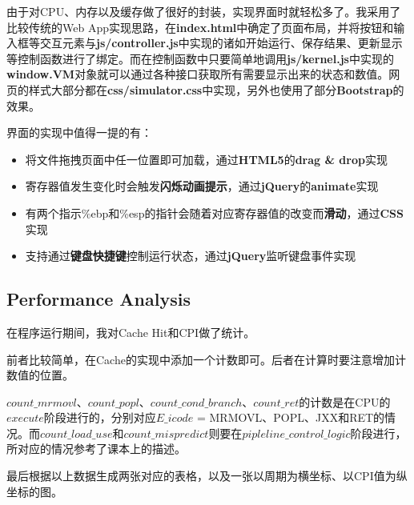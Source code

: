 由于对CPU、内存以及缓存做了很好的封装，实现界面时就轻松多了。我采用了比较传统的Web App实现思路，在{\bf index.html}中确定了页面布局，并将按钮和输入框等交互元素与{\bf js/controller.js}中实现的诸如开始运行、保存结果、更新显示等控制函数进行了绑定。而在控制函数中只要简单地调用{\bf js/kernel.js}中实现的{\bf window.VM}对象就可以通过各种接口获取所有需要显示出来的状态和数值。网页的样式大部分都在{\bf css/simulator.css}中实现，另外也使用了部分{\bf Bootstrap}的效果。

界面的实现中值得一提的有：
\begin{itemize}
\item 将文件拖拽页面中任一位置即可加载，通过{\bf HTML5}的{\bf drag \& drop}实现
\item 寄存器值发生变化时会触发{\bf 闪烁动画提示}，通过{\bf jQuery}的{\bf animate}实现
\item 有两个指示\%ebp和\%esp的指针会随着对应寄存器值的改变而{\bf 滑动}，通过{\bf CSS}实现
\item 支持通过{\bf 键盘快捷键}控制运行状态，通过{\bf jQuery}监听键盘事件实现
\end{itemize}

\subsection{Performance Analysis}

在程序运行期间，我对Cache Hit和CPI做了统计。

前者比较简单，在Cache的实现中添加一个计数即可。后者在计算时要注意增加计数值的位置。

$count\_mrmovl$、$count\_popl$、$count\_cond\_branch$、$count\_ret$的计数是在CPU的{\bf $execute$}阶段进行的，分别对应$E\_icode$ = MRMOVL、POPL、JXX和RET的情况。而$count\_load\_use$和$count\_mispredict$则要在{\bf $pipleline\_control\_logic$}阶段进行，所对应的情况参考了课本上的描述。

最后根据以上数据生成两张对应的表格，以及一张以周期为横坐标、以CPI值为纵坐标的图。